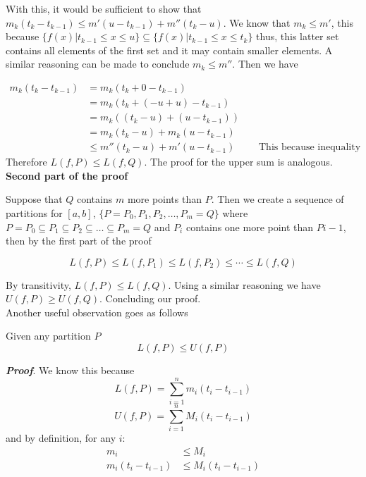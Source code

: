 \documentclass{report}
\begin{document}
    With this, it would be sufficient to show that $m_k(t_k-t_{k-1}) \leq m'(u - t_{k-1}) + m''(t_k-u)$. We know that $m_k \leq m'$, this because $\{f(x) | t_{k-1} \leq x \leq u\} \subseteq \{f(x) | t_{k-1} \leq x \leq t_k\}$ thus, this latter set contains all elements of the first set and it may contain smaller elements. A similar reasoning can be made to conclude $m_k \leq m''$. Then we have

    \begin{align*}
        m_k(t_k-t_{k-1}) &= m_k(t_k+0-t_{k-1})\\
        &= m_k(t_k+(-u+u)-t_{k-1})\\
        &= m_k((t_k-u)+(u-t_{k-1}))\\
        &= m_k(t_k-u)+m_k(u-t_{k-1})\\
        &\leq m''(t_k-u) + m'(u-t_{k-1}) &&\text{ This because inequality properties.}
    \end{align*}
    Therefore $L(f,P) \leq L(f, Q)$. The proof for the upper sum is analogous.\\

    \noindent\textbf{Second part of the proof}

    Suppose that $Q$ contains $m$ more points than $P$. Then we create a sequence of partitions for $[a,b]$, $\{P = P_0, P_1, P_2, \dots , P_m = Q\}$ where $P = P_0 \subseteq P_1 \subseteq P_2 \subseteq \dots \subseteq P_m = Q$ and $P_i$ contains one more point than $P{i-1}$, then by the first part of the proof

    $$L(f,P) \leq L(f,P_1) \leq L(f,P_2) \leq \cdots \leq L(f,Q)$$

    By transitivity, $L(f,P) \leq L(f,Q)$. Using a similar reasoning we have $U(f,P) \geq U(f,Q)$. Concluding our proof.
    \\

    Another useful observation goes as follows

    \begin{lemBox}
        Given any partition $P$
        $$L(f, P) \leq U(f, P)$$
    \end{lemBox}
    \textit{\textbf{Proof}}. We know this because
    $$L(f, P) = \sum_{i=1}^{n}m_i(t_{i} - t_{i-1})$$
    $$U(f, P) = \sum_{i=1}^{n}M_i(t_{i} - t_{i-1})$$
    and by definition, for any $i$:
    \begin{align*}
        m_i &\leq M_i\\
        m_i(t_{i} - t_{i-1}) &\leq M_i(t_{i} - t_{i-1})
    \end{align*}
\end{document}
